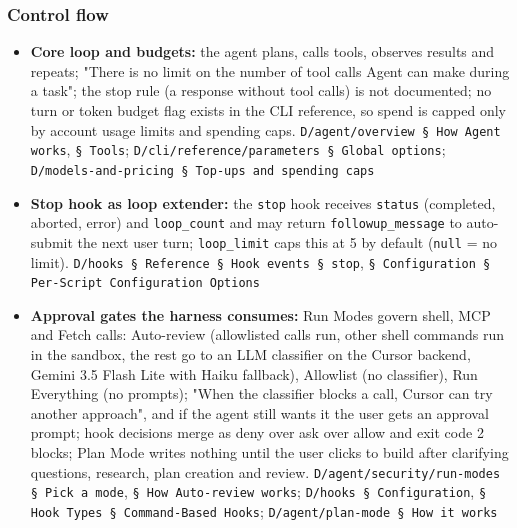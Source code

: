 \subsubsection*{Control flow}
\begin{itemize}
\item \textbf{Core loop and budgets:} the agent plans, calls tools, observes results and repeats; "There is no limit on the number of tool calls Agent can make during a task"; the stop rule (a response without tool calls) is not documented; no turn or token budget flag exists in the CLI reference, so spend is capped only by account usage limits and spending caps. \texttt{D/\allowbreak{}agent/\allowbreak{}overview § How Agent works}, \texttt{§ Tools}; \texttt{D/\allowbreak{}cli/\allowbreak{}reference/\allowbreak{}parameters § Global options}; \texttt{D/\allowbreak{}models-\allowbreak{}and-\allowbreak{}pricing § Top-\allowbreak{}ups and spending caps}
\item \textbf{Stop hook as loop extender:} the \texttt{stop} hook receives \texttt{status} (completed, aborted, error) and \texttt{loop\_\allowbreak{}count} and may return \texttt{followup\_\allowbreak{}message} to auto-submit the next user turn; \texttt{loop\_\allowbreak{}limit} caps this at 5 by default (\texttt{null} = no limit). \texttt{D/\allowbreak{}hooks § Reference § Hook events § stop}, \texttt{§ Configuration § Per-\allowbreak{}Script Configuration Options}
\item \textbf{Approval gates the harness consumes:} Run Modes govern shell, MCP and Fetch calls: Auto-review (allowlisted calls run, other shell commands run in the sandbox, the rest go to an LLM classifier on the Cursor backend, Gemini 3.5 Flash Lite with Haiku fallback), Allowlist (no classifier), Run Everything (no prompts); "When the classifier blocks a call, Cursor can try another approach", and if the agent still wants it the user gets an approval prompt; hook decisions merge as deny over ask over allow and exit code 2 blocks; Plan Mode writes nothing until the user clicks to build after clarifying questions, research, plan creation and review. \texttt{D/\allowbreak{}agent/\allowbreak{}security/\allowbreak{}run-\allowbreak{}modes § Pick a mode}, \texttt{§ How Auto-\allowbreak{}review works}; \texttt{D/\allowbreak{}hooks § Configuration}, \texttt{§ Hook Types § Command-\allowbreak{}Based Hooks}; \texttt{D/\allowbreak{}agent/\allowbreak{}plan-\allowbreak{}mode § How it works}

\end{itemize}
